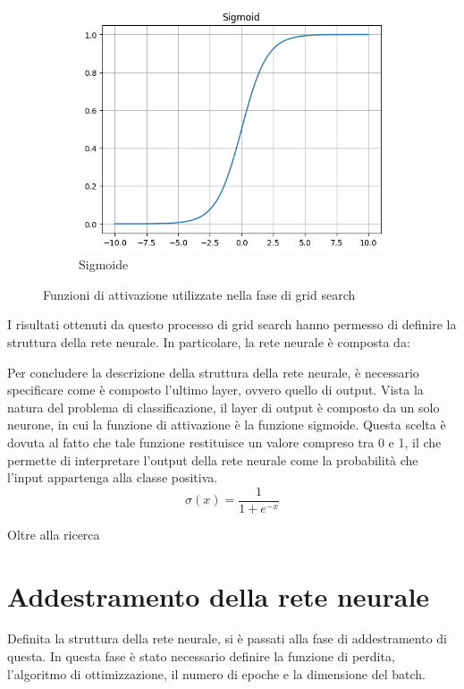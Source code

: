 \begin{figure}[!ht]
    \hfill
    \begin{subfigure}[b]{0.3\textwidth}
        \centering
        \includegraphics[width=\textwidth]{img/rete/sigmoid.png}
        \caption{Sigmoide}
        \label{fig:sigmoid}
    \end{subfigure}
       \caption{Funzioni di attivazione utilizzate nella fase di grid search}
       \label{fig:}
\end{figure}

I risultati ottenuti da questo processo di grid search hanno permesso di definire
la struttura della rete neurale. In particolare, la rete neurale è composta da:

Per concludere la descrizione della struttura della rete neurale, è necessario
specificare come è composto l'ultimo layer, ovvero quello di output. Vista la  
natura del problema di classificazione, il layer di output è composto da un solo
neurone, in cui la funzione di attivazione è la funzione sigmoide. Questa scelta
è dovuta al fatto che tale funzione restituisce un valore compreso tra 0
e 1, il che permette di interpretare l'output della rete neurale come la
probabilità che l'input appartenga alla classe positiva.
\begin{equation}
    \sigma(x) = \frac{1}{1 + e^{-x}}
\end{equation}

Oltre alla ricerca
\section{Addestramento della rete neurale}
Definita la struttura della rete neurale, si è passati alla fase di addestramento
di questa. In questa fase è stato necessario definire la funzione di perdita,
l'algoritmo di ottimizzazione, il numero di epoche e la dimensione del batch.

